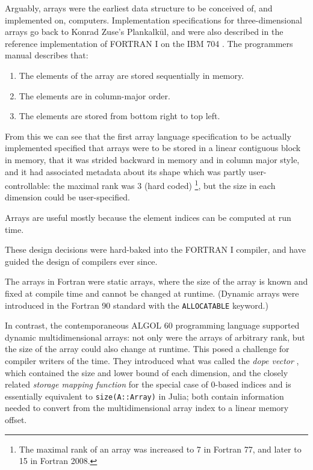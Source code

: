 \documentclass[preprint]{sigplanconf}
\newcommand{\ALGOL}{A\textsc{LGOL}}
\newcommand{\code}[1]{\texttt{#1}}
\begin{document}
Arguably, arrays were the earliest data structure to be conceived of, and implemented on, computers. Implementation specifications for three-dimensional arrays go back to Konrad Zuse's Plankalk\"ul, and were also described in the reference implementation of FORTRAN I on the IBM 704 \cite{Backus:1957fa}. The programmers manual \cite[pp.~10--11]{Backus:1956pr} describes that:


\begin{enumerate}
\item The elements of the array are stored sequentially in memory.
\item The elements are in column-major order.
\item The elements are stored from bottom right to top left.
\end{enumerate}

From this we can see that the first array language specification to be actually implemented specified that arrays were to be stored in a linear contiguous block in memory, that it was strided backward in memory and in column major style, and it had associated metadata about its shape which was partly user-controllable: the maximal rank was 3 (hard coded) \footnote{The maximal rank of an array was increased to 7 in Fortran 77, and later to 15 in Fortran 2008.}, but the size in each dimension could be user-specified.

Arrays are useful mostly because the element indices can be computed at run time.



These design decisions were hard-baked into the FORTRAN I compiler, and have guided the design of compilers ever since.

The arrays in Fortran were static arrays, where the size of the array is known and fixed at compile time and cannot be changed at runtime. (Dynamic arrays were introduced in the Fortran 90 standard with the \code{ALLOCATABLE} keyword.)


In contrast, the contemporaneous \ALGOL{} 60 programming language supported dynamic multidimensional arrays: not only were the arrays of arbitrary rank, but the size of the array could also change at runtime. This posed a challenge for compiler writers of the time. They introduced what was called the \textit{dope vector} \cite{Sattley:1960as, Sattley:1961as}, which contained the size and lower bound of each dimension, and the closely related \textit{storage mapping function} \cite[pp.~80--87]{Randell:1964a6} for the special case of 0-based indices and is essentially equivalent to \code{size(A::Array)} in Julia; both contain information needed to convert from the multidimensional array index to a linear memory offset.
\end{document}
